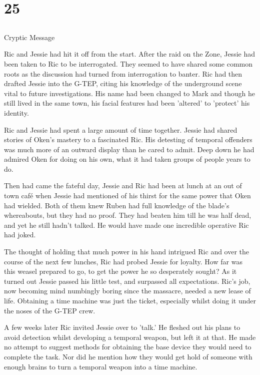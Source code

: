 \chapter{25}
\section{}
Cryptic Message  

Ric and Jessie had hit it off from the start.  After the raid on the Zone, Jessie had been taken to Ric to be interrogated.  They seemed to have shared some common roots as the discussion had turned from interrogation to banter.  Ric had then drafted Jessie into the G-TEP, citing his knowledge of the underground scene vital to future investigations.  His name had been changed to Mark and though he still lived in the same town, his facial features had been 'altered' to 'protect' his identity.

Ric and Jessie had spent a large amount of time together.  Jessie had shared stories of Oken's mastery to a fascinated Ric.  His detesting of temporal offenders was much more of an outward display than he cared to admit.  Deep down he had admired Oken for doing on his own, what it had taken groups of people years to do.

Then had came the fateful day, Jessie and Ric had been at lunch at an out of town café when Jessie had mentioned of his thirst for the same power that Oken had wielded.  Both of them knew Ruben had full knowledge of the blade's whereabouts, but they had no proof.  They had beaten him till he was half dead, and yet he still hadn't talked.  He would have made one incredible operative Ric had joked.

The thought of holding that much power in his hand intrigued Ric and over the course of the next few lunches, Ric had probed Jessie for loyalty.  How far was this weasel prepared to go, to get the power he so desperately sought?  As it turned out Jessie passed his little test, and surpassed all expectations.  Ric's job, now becoming mind numbingly boring since the massacre, needed a new lease of life.  Obtaining a time machine was just the ticket, especially whilst doing it under the noses of the G-TEP crew.

A few weeks later Ric invited Jessie over to 'talk.'  He fleshed out his plans to avoid detection whilst developing a temporal weapon, but left it at that.  He made no attempt to suggest methods for obtaining the base device they would need to complete the task.  Nor did he mention how they would get hold of someone with enough brains to turn a temporal weapon into a time machine.  

